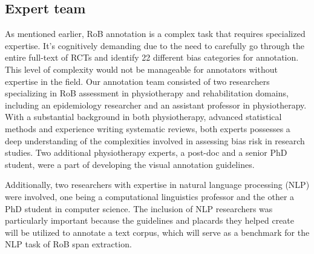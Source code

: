 \documentclass[sn-mathphys,Numbered]{sn-jnl}%
\theoremstyle{thmstyleone}%
\theoremstyle{thmstyletwo}%
\theoremstyle{thmstylethree}%
\begin{document}
%
%
%
%
%
%
\subsection{Expert team}
\label{experts}
%
As mentioned earlier, RoB annotation is a complex task that requires specialized expertise.
It's cognitively demanding due to the need to carefully go through the entire full-text of RCTs and identify 22 different bias categories for annotation.
This level of complexity would not be manageable for annotators without expertise in the field.
Our annotation team consisted of two researchers specializing in RoB assessment in physiotherapy and rehabilitation domains, including an epidemiology researcher and an assistant professor in physiotherapy.
With a substantial background in both physiotherapy, advanced statistical methods and experience writing systematic reviews, both experts possesses a deep understanding of the complexities involved in assessing bias risk in research studies.
Two additional physiotherapy experts, a post-doc and a senior PhD student, were a part of developing the visual annotation guidelines.


Additionally, two researchers with expertise in natural language processing (NLP) were involved, one being a computational linguistics professor and the other a PhD student in computer science.
The inclusion of NLP researchers was particularly important because the guidelines and placards they helped create will be utilized to annotate a text corpus, which will serve as a benchmark for the NLP task of RoB span extraction.
%
%
%
\end{document}
